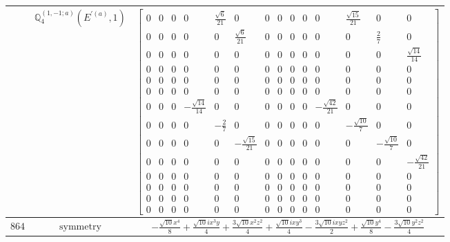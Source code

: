 \documentclass[fleqn,8pt,landscape]{jsarticle}
\begin{document}
\begin{longtable}{ccc}
$  $ & $ \mathbb{Q}_{4}^{(1,-1;a)}(E^{\prime(a)},1) $ & $ \begin{bmatrix} 0 & 0 & 0 & 0 & \frac{\sqrt{6}}{21} & 0 & 0 & 0 & 0 & 0 & 0 & \frac{\sqrt{15}}{21} & 0 & 0 \\ 0 & 0 & 0 & 0 & 0 & \frac{\sqrt{6}}{21} & 0 & 0 & 0 & 0 & 0 & 0 & \frac{2}{7} & 0 \\ 0 & 0 & 0 & 0 & 0 & 0 & 0 & 0 & 0 & 0 & 0 & 0 & 0 & \frac{\sqrt{14}}{14} \\ 0 & 0 & 0 & 0 & 0 & 0 & 0 & 0 & 0 & 0 & 0 & 0 & 0 & 0 \\ 0 & 0 & 0 & 0 & 0 & 0 & 0 & 0 & 0 & 0 & 0 & 0 & 0 & 0 \\ 0 & 0 & 0 & 0 & 0 & 0 & 0 & 0 & 0 & 0 & 0 & 0 & 0 & 0 \\ 0 & 0 & 0 & - \frac{\sqrt{14}}{14} & 0 & 0 & 0 & 0 & 0 & 0 & - \frac{\sqrt{42}}{21} & 0 & 0 & 0 \\ 0 & 0 & 0 & 0 & - \frac{2}{7} & 0 & 0 & 0 & 0 & 0 & 0 & - \frac{\sqrt{10}}{7} & 0 & 0 \\ 0 & 0 & 0 & 0 & 0 & - \frac{\sqrt{15}}{21} & 0 & 0 & 0 & 0 & 0 & 0 & - \frac{\sqrt{10}}{7} & 0 \\ 0 & 0 & 0 & 0 & 0 & 0 & 0 & 0 & 0 & 0 & 0 & 0 & 0 & - \frac{\sqrt{42}}{21} \\ 0 & 0 & 0 & 0 & 0 & 0 & 0 & 0 & 0 & 0 & 0 & 0 & 0 & 0 \\ 0 & 0 & 0 & 0 & 0 & 0 & 0 & 0 & 0 & 0 & 0 & 0 & 0 & 0 \\ 0 & 0 & 0 & 0 & 0 & 0 & 0 & 0 & 0 & 0 & 0 & 0 & 0 & 0 \\ 0 & 0 & 0 & 0 & 0 & 0 & 0 & 0 & 0 & 0 & 0 & 0 & 0 & 0 \end{bmatrix} $ \\ \hline
$ 864 $ & $ \text{symmetry} $ & $ - \frac{\sqrt{10} x^{4}}{8} + \frac{\sqrt{10} i x^{3} y}{4} + \frac{3 \sqrt{10} x^{2} z^{2}}{4} + \frac{\sqrt{10} i x y^{3}}{4} - \frac{3 \sqrt{10} i x y z^{2}}{2} + \frac{\sqrt{10} y^{4}}{8} - \frac{3 \sqrt{10} y^{2} z^{2}}{4} $ \\

\end{longtable}
\end{document}
